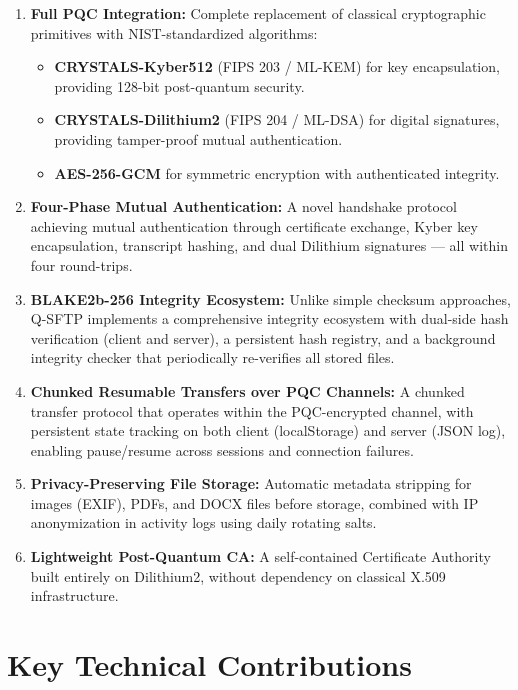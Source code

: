 \begin{enumerate}
    \item \textbf{Full PQC Integration:} Complete replacement of classical cryptographic primitives with NIST-standardized algorithms:
    \begin{itemize}
        \item \textbf{CRYSTALS-Kyber512} (FIPS 203 / ML-KEM) for key encapsulation, providing 128-bit post-quantum security.
        \item \textbf{CRYSTALS-Dilithium2} (FIPS 204 / ML-DSA) for digital signatures, providing tamper-proof mutual authentication.
        \item \textbf{AES-256-GCM} for symmetric encryption with authenticated integrity.
    \end{itemize}
    
    \item \textbf{Four-Phase Mutual Authentication:} A novel handshake protocol achieving mutual authentication through certificate exchange, Kyber key encapsulation, transcript hashing, and dual Dilithium signatures — all within four round-trips.
    
    \item \textbf{BLAKE2b-256 Integrity Ecosystem:} Unlike simple checksum approaches, Q-SFTP implements a comprehensive integrity ecosystem with dual-side hash verification (client and server), a persistent hash registry, and a background integrity checker that periodically re-verifies all stored files.
    
    \item \textbf{Chunked Resumable Transfers over PQC Channels:} A chunked transfer protocol that operates within the PQC-encrypted channel, with persistent state tracking on both client (localStorage) and server (JSON log), enabling pause/resume across sessions and connection failures.
    
    \item \textbf{Privacy-Preserving File Storage:} Automatic metadata stripping for images (EXIF), PDFs, and DOCX files before storage, combined with IP anonymization in activity logs using daily rotating salts.
    
    \item \textbf{Lightweight Post-Quantum CA:} A self-contained Certificate Authority built entirely on Dilithium2, without dependency on classical X.509 infrastructure.
\end{enumerate}

\section{Key Technical Contributions}

